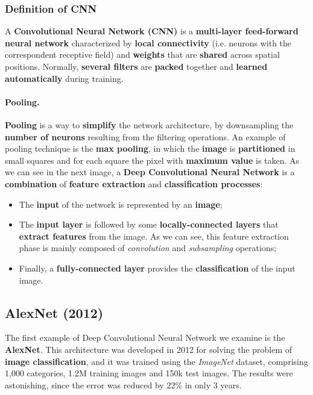 \subsubsection{Definition of CNN}
A \textbf{Convolutional Neural Network (CNN)} is a \textbf{multi-layer feed-forward neural network} characterized by \textbf{local connectivity} (i.e. neurons with the correspondent receptive field) and \textbf{weights} that are \textbf{shared} across spatial positions. Normally, \textbf{several filters} are \textbf{packed} together and \textbf{learned automatically} during training.

\paragraph{Pooling.}\textbf{Pooling} is a way to \textbf{simplify} the network architecture, by downsampling the \textbf{number of neurons} resulting from the filtering operations. An example of pooling technique is the \textbf{max pooling}, in which the \textbf{image} is \textbf{partitioned} in small squares and for each square the pixel with \textbf{maximum value} is taken.
As we can see in the next image, a \textbf{Deep Convolutional Neural Network} is a \textbf{combination} of \textbf{feature extraction} and \textbf{classification processes}:

\begin{itemize}
    \item The \textbf{input} of the network is represented by an \textbf{image};
    \item The \textbf{input layer} is followed by some \textbf{locally-connected layers} that \textbf{extract features} from the image. As we can see, this feature extraction phase is mainly composed of \textit{convolution} and \textit{subsampling} operations;
    \item Finally, a \textbf{fully-connected layer} provides the \textbf{classification} of the input image.
\end{itemize}


\subsection{AlexNet (2012)} 
The first example of Deep Convolutional Neural Network we examine is the \textbf{AlexNet}. This architecture was developed in 2012 for solving the problem of \textbf{image classification}, and it was trained using the \textit{ImageNet} dataset, comprising 1,000 categories, 1.2M training images and 150k test images. The results were astonishing, since the error was reduced by 22\% in only 3 years.

